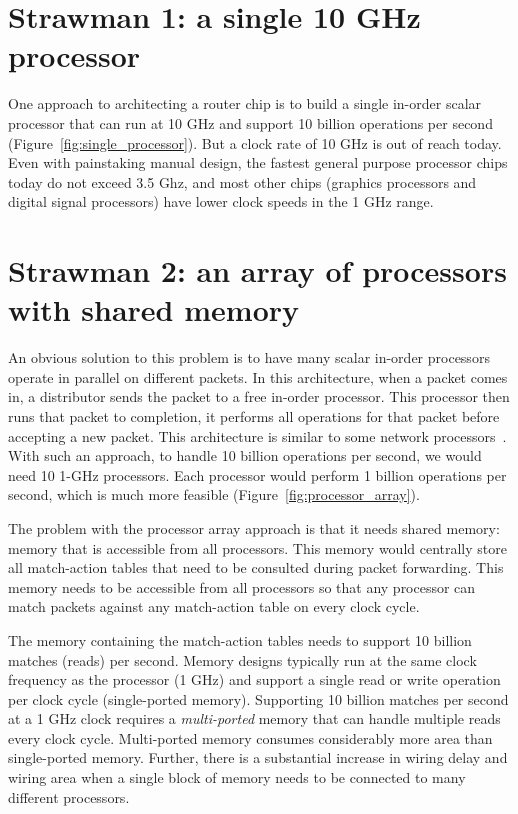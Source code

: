 \section{Strawman 1: a single 10 GHz processor}
One approach to architecting a router chip is to build a single in-order scalar
processor that can run at 10 GHz and support 10 billion operations per second
(Figure~\ref{fig:single_processor}). But a clock rate of 10 GHz is out of reach
today. Even with painstaking manual design, the fastest general purpose
processor chips today do not exceed 3.5 Ghz, and most other chips (\eg graphics
processors and digital signal processors) have lower clock speeds in the 1 GHz
range.

\section{Strawman 2: an array of processors with shared memory}
An obvious solution to this problem is to have many scalar in-order processors
operate in parallel on different packets. In this architecture, when a packet
comes in, a distributor sends the packet to a free in-order processor. This
processor then runs that packet to completion, \ie it performs all operations
for that packet before accepting a new packet. This architecture is similar to
some network processors~\cite{ixp1200, ixp2800, quantumflow}.  With such an
approach, to handle 10 billion operations per second, we would need 10 1-GHz
processors. Each processor would perform 1 billion operations per second, which
is much more feasible (Figure~\ref{fig:processor_array}).

The problem with the processor array approach is that it needs shared memory:
 memory that is accessible from all processors. This memory would centrally
store all match-action tables that need to be consulted during packet
forwarding. This memory needs to be accessible from all processors so that any
processor can match packets against any match-action table on every clock
cycle.

The memory containing the match-action tables needs to support 10 billion
matches (reads) per second. Memory designs typically run at the same clock
frequency as the processor (1 GHz) and support a single read or write operation
per clock cycle (single-ported memory). Supporting 10 billion matches per second at a
1 GHz clock requires a {\em multi-ported} memory that can handle multiple reads
every clock cycle. Multi-ported memory consumes considerably more area than
single-ported memory.  Further, there is a substantial increase in wiring delay
and wiring area when a single block of memory needs to be connected to many
different processors.

